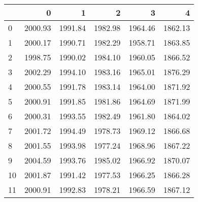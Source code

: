 \begin{tabular}{lrrrrr}
\toprule
{} &        0 &        1 &        2 &        3 &        4 \\
\midrule
0  &  2000.93 &  1991.84 &  1982.98 &  1964.46 &  1862.13 \\
1  &  2000.17 &  1990.71 &  1982.29 &  1958.71 &  1863.85 \\
2  &  1998.75 &  1990.02 &  1984.10 &  1960.05 &  1866.52 \\
3  &  2002.29 &  1994.10 &  1983.16 &  1965.01 &  1876.29 \\
4  &  2000.55 &  1991.78 &  1983.14 &  1964.00 &  1871.92 \\
5  &  2000.91 &  1991.85 &  1981.86 &  1964.69 &  1871.99 \\
6  &  2000.31 &  1993.55 &  1982.49 &  1961.80 &  1864.02 \\
7  &  2001.72 &  1994.49 &  1978.73 &  1969.12 &  1866.68 \\
8  &  2001.55 &  1993.98 &  1977.24 &  1968.96 &  1867.22 \\
9  &  2004.59 &  1993.76 &  1985.02 &  1966.92 &  1870.07 \\
10 &  2001.87 &  1991.42 &  1977.53 &  1966.25 &  1866.28 \\
11 &  2000.91 &  1992.83 &  1978.21 &  1966.59 &  1867.12 \\
\bottomrule
\end{tabular}
